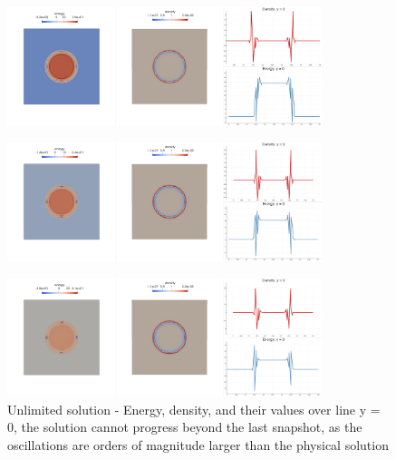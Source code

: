 	\begin{figure}[H]
		\begin{center}
			\includegraphics[width=0.82\textwidth]{img/limit/nl4.jpg}
		\end{center}
	\end{figure}\vspace{-12mm}
	\begin{figure}[H]
		\begin{center}
			\includegraphics[width=0.82\textwidth]{img/limit/nl5.jpg}
		\end{center}
	\end{figure}\vspace{-12mm}
	\begin{figure}[H]
		\begin{center}
			\includegraphics[width=0.82\textwidth]{img/limit/nl6.jpg}		
			\vspace{-4mm}
			\caption{Unlimited solution - Energy, density, and their values over line y = 0, the solution cannot progress beyond the last snapshot, as the oscillations are orders of magnitude larger than the physical solution}
		\end{center}
	\end{figure}
	
	\newpage
	
